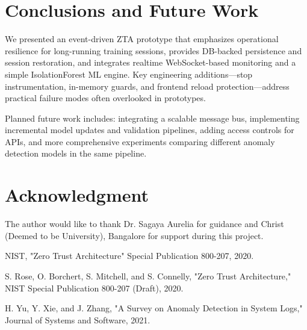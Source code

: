\documentclass[conference]{IEEEtran}
\begin{document}
\section{Conclusions and Future Work}
We presented an event-driven ZTA prototype that emphasizes operational resilience for long-running training sessions, provides DB-backed persistence and session restoration, and integrates realtime WebSocket-based monitoring and a simple IsolationForest ML engine. Key engineering additions—stop instrumentation, in-memory guards, and frontend reload protection—address practical failure modes often overlooked in prototypes.

Planned future work includes: integrating a scalable message bus, implementing incremental model updates and validation pipelines, adding access controls for APIs, and more comprehensive experiments comparing different anomaly detection models in the same pipeline.

\section*{Acknowledgment}
The author would like to thank Dr. Sagaya Aurelia for guidance and Christ (Deemed to be University), Bangalore for support during this project.

\begin{thebibliography}{9}
NIST, "Zero Trust Architecture" Special Publication 800-207, 2020.

S. Rose, O. Borchert, S. Mitchell, and S. Connelly, "Zero Trust Architecture," NIST Special Publication 800-207 (Draft), 2020.

H. Yu, Y. Xie, and J. Zhang, "A Survey on Anomaly Detection in System Logs," Journal of Systems and Software, 2021.

\end{thebibliography}
\end{document}
